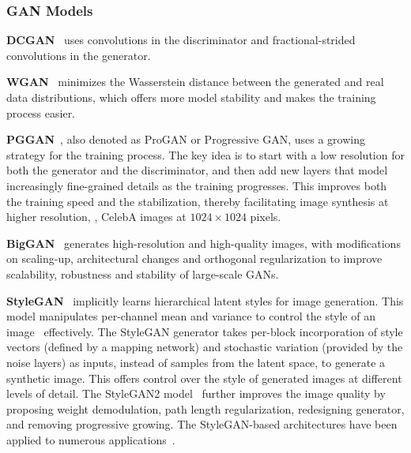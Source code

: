 \subsubsection{GAN Models} 
\label{sec:gan models}

\noindent\textbf{DCGAN}~\cite{radford2016dcgan} uses convolutions in the discriminator and fractional-strided convolutions in the generator. \par

\vspace{1mm}
\noindent\textbf{WGAN}~\cite{gulrajani2017improved} minimizes the Wasserstein distance between the generated and real data distributions, which offers more model stability and makes the training process easier.\par

\vspace{1mm}
\noindent\textbf{PGGAN}~\cite{karras2017progressive}, also denoted as ProGAN or Progressive GAN, uses a growing strategy for the training process. 
The key idea is to start with a low resolution for both the generator and the discriminator, and then add new layers that model increasingly fine-grained details as the training progresses. 
This improves both the training speed and the stabilization, thereby facilitating image synthesis at higher resolution, \eg, CelebA images at $1024 \times 1024$ pixels. \par

\vspace{1mm}
\noindent\textbf{BigGAN}~\cite{brock2018large} generates high-resolution and high-quality images, with modifications on scaling-up, architectural changes and orthogonal regularization to improve scalability, robustness and stability of large-scale GANs.\par

\vspace{1mm}
\noindent\textbf{StyleGAN}~\cite{karras2019style} implicitly learns hierarchical latent styles for image generation. 
This model manipulates per-channel mean and variance to control the style of an image~\cite{huang2017adain} effectively.
The StyleGAN generator takes per-block incorporation of style vectors (defined by a mapping network) and stochastic variation (provided by the noise layers) as inputs, instead of samples from the latent space, to generate a synthetic image. 
This offers control over the style of generated images at different levels of detail.
The StyleGAN2 model~\cite{karras2020analyzing} further improves the image quality by proposing weight demodulation, path length regularization, redesigning generator, and removing progressive growing. 
The StyleGAN-based architectures have been applied to numerous applications~\cite{gabbay2019style,zhu2020sean,zhu2020semantically}.\par

